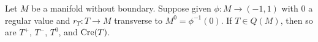 \begin{comment}
	The lemma itself will also be important when we consider products below in Section \ref{S: products}.

	\begin{lemma}\label{L: pullback with Q}
		Let $M$ be a manifold without boundary.
		Suppose $T \in PC_*^\Gamma(M)$ (or $PC^*_\Gamma(M)$), and that $T \in Q(M)$.
		Then $T \times_M W \in Q(M)$ and $W \times_M T \in Q(M)$ for any $W$ in $PC_*^\Gamma(M)$ (or $PC^*_\Gamma(M)$) that is transverse to $T$.
	\end{lemma}
	\begin{proof}
		We consider only $T \times_M W$ as the arguments for $W \times_M T$ are the same.
		By assumption $T$ is the disjoint union of trivial and degenerate chains, so it suffices to consider independently the possibilities that $T$ is trivial or degenerate.

		If $\rho$ is a (co\nobreakdash-)orientation reversing diffeomorphism of $T$ over $M$, then $\rho \times_M \id_W$ is a (co\nobreakdash-)orientation reversing diffeomorphism of $T \times_M W$, by Joyce's construction in the oriented case and by Remark \ref{R: co-or restriction or switch} in the co-oriented case.

		Next assume that $T$ is degenerate, so in particular it has small rank.
		Recall that the tangent bundle of a fiber product is the fiber product of the tangent bundles \cite[Theorem 5.47]{Wed16}, and so the derivative is the fiber product of derivatives.
		Note that the fiber product of two linear maps, one with a non-trivial kernel must also have a non-trivial kernel: If $A,B$ are linear maps with a common codomain and $v \in \ker(A)$, then $(v,0)$ is in the kernel of the fiber product of $A$ and $B$.
		So if the differential of $r_W$ has non-trivial kernel everywhere so will the derivative of any fiber product with $r_W$.
		Thus $T \times_M W$ has small rank.

		Next we recall $\bd(T \times_M W) = (\bd T) \times_M W \bigsqcup \pm T \times_M (\bd W)$.
		We have just shown that $T \times_M (\bd W)$ must have small rank.
		As $T$ is degenerate, $\bd T$ is a disjoint of trivial and small rank manifolds over $M$, and so by the preceding arguments $(\bd T) \times_M W$ will be a union of trivial and small rank manifolds over $M$.
		Altogether, $T \times_M W$ is degenerate.
	\end{proof}
\end{comment}

\begin{corollary}\label{C: creasing Q}
	Let $M$ be a manifold without boundary.
	Suppose given $\phi \colon M \to (-1,1)$ with $0$ a regular value and $r_T \colon T \to M$ transverse to $M^0 = \phi^{-1}(0)$.
	If $T \in Q(M)$, then so are $T^+$, $T^-$, $T^0$, and $\mathrm{Cre}(T)$.
\end{corollary}

